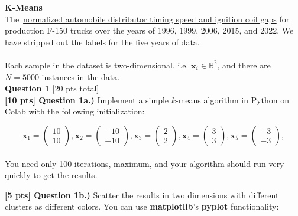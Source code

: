 \documentclass[paper=a4, fontsize=11pt]{scrartcl} %
\author{
    \textbf{YOUR NAME} \\ 
    \textbf{YOUR GIT USERNAME} \\ 
    \textbf{YOUR E-MAIL}
}%
\begin{document}
\maketitle %

{\huge \textbf{K-Means}} \\

The~\href{https://course.ccs.neu.edu/cs6220/homework-4/data/}{normalized automobile distributor timing speed and ignition coil gaps} for production F-150 trucks over the years of 1996, 1999, 2006, 2015, and 2022. We have stripped out the labels for the five years of data.\\
\\
Each sample in the dataset is two-dimensional, i.e. $\textbf{x}_i \in \mathbb{R}^2$, and there are $N=5000$ instances in the data.
\\

{\Large \textbf{Question 1} [20 pts total]} \\

\textbf{[10 pts] Question 1a.)} Implement a simple $k$-means algorithm in Python on Colab with the following initialization:

\begin{equation}
\textbf{x}_1 = \left( \begin{matrix} 10 \\ 10 \end{matrix} \right), \textbf{x}_2 = \left( \begin{matrix} -10 \\ -10 \end{matrix} \right),
\textbf{x}_3 = \left( \begin{matrix} 2 \\ 2 \end{matrix} \right),
\textbf{x}_4 = \left( \begin{matrix} 3 \\ 3 \end{matrix} \right),
\textbf{x}_5 = \left( \begin{matrix} -3 \\ -3 \end{matrix} \right),
\end{equation} \\

You need only 100 iterations, maximum, and your algorithm should run very quickly to get the results. 

\textbf{[5 pts] Question 1b.)} Scatter the results in two dimensions with different clusters as different colors. You can use \textbf{matplotlib}'s \textbf{pyplot} functionality:
\end{document}
